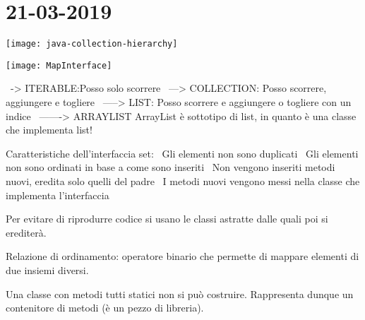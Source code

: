 

\newpage
\section{21-03-2019}
\begin{center}
\texttt{[image: java-collection-hierarchy]}
\end{center} 

\begin{center}
\texttt{[image: MapInterface]}
\end{center} 
\textbullet\ -> ITERABLE:Posso solo scorrere \newline
\textbullet\ ---> COLLECTION: Posso scorrere, aggiungere e togliere \newline
\textbullet\ -----> LIST: Posso scorrere e aggiungere o togliere con un indice \newline
\textbullet\ -------> ARRAYLIST \newline
ArrayList è sottotipo di list, in quanto è una classe che implementa list! \newline
{} \newline

\noindent Caratteristiche dell'interfaccia set:\newline
\textbullet\ Gli elementi non sono duplicati \newline
\textbullet\ Gli elementi non sono ordinati in base a come sono inseriti \newline	
\textbullet\ Non vengono inseriti metodi nuovi, eredita solo quelli del padre \newline
\textbullet\ I metodi nuovi vengono messi nella classe che implementa l'interfaccia \newline

\noindent Per evitare di riprodurre codice si usano le classi astratte dalle quali poi si erediterà. 

\noindent Relazione di ordinamento: operatore binario che permette di mappare elementi di due insiemi diversi.

\noindent Una classe con metodi tutti statici non si può costruire. Rappresenta dunque un contenitore di metodi (è un pezzo di libreria).

